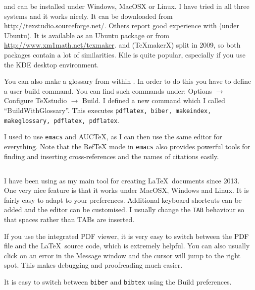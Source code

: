 \TeXstudio{} and
\TeXmaker{} can be installed under Windows, MacOSX or
Linux. I have tried \TeXstudio in all three systems and it works nicely. It
can be downloaded from \url{http://texstudio.sourceforge.net/}. Others
report good experience with \TeXmaker (under Ubuntu).
It is available as an Ubuntu package or from
\url{http://www.xm1math.net/texmaker}.
\TeXmaker and \TeXstudio (\TeX makerX) split in 2009, so both packages
contain a lot of similarities.
Kile is quite popular, especially if you use the KDE
desktop environment. 

You can also make a glossary from within \TeXstudio. In order to do
this you have to define a user build command. You can find such commands
under:  \textsf{Options} $\to$ \textsf{Configure TeXstudio} $\to$
\textsf{Build}. I defined a new command which I called
\enquote{BuildWithGlossary}. This executes \texttt{pdflatex, biber,
  makeindex, makeglossary, pdflatex, pdflatex}.

I used to use \texttt{emacs} and AUCTeX, as I can
then use the same editor for everything. Note that the
RefTeX mode in \texttt{emacs} also provides powerful
tools for finding and inserting cross-references and the names of
citations easily.


\subsection{\TeXstudio}
\label{sec:app:texstudio}

I have been using \TeXstudio as my main tool for creating \LaTeX\ documents since 2013.
One very nice feature is that it works under MacOSX, Windows and Linux.
It is fairly easy to adapt to your preferences.
Additional keyboard shortcuts can be added and the editor can be customised.
I usually change the \texttt{TAB} behaviour so that spaces rather than TABs are inserted.

If you use the integrated PDF viewer, it is very easy to switch between the PDF file and
the \LaTeX\ source code, which is extremely helpful.
You can also usually click on an error in the Message window and the cursor will jump to the right spot.
This makes debugging and proofreading much easier.

It is easy to switch between \texttt{biber} and \texttt{bibtex} using the Build preferences.


